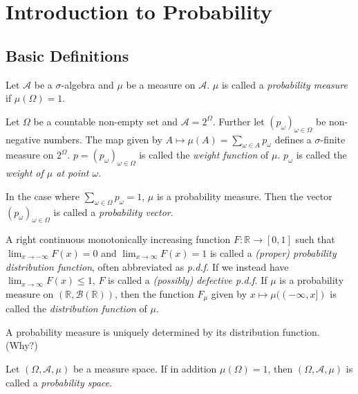 \section{Introduction to Probability}

\subsection{Basic Definitions}

\begin{definition}
    Let $\mathcal{A}$ be a $\sigma$-algebra and $\mu$ be a measure on $\mathcal{A}$. $\mu$ is called a \textit{probability measure} if $\mu(\Omega)=1$.
\end{definition}

Let $\Omega$ be a countable non-empty set and $\mathcal{A}=2^\Omega$. Further let $(p_\omega)_{\omega\in\Omega}$ be non-negative numbers. The map given by $A\mapsto\mu(A)=\sum_{\omega\in A}p_\omega$ defines a $\sigma$-finite measure on $2^\Omega$. $p=(p_\omega)_{\omega\in\Omega}$ is called the \textit{weight function} of $\mu$. $p_\omega$ is called the \textit{weight of $\mu$ at point $\omega$}.

In the case where $\sum_{\omega\in\Omega}p_\omega=1$, $\mu$ is a probability measure. Then the vector $(p_\omega)_{\omega\in\Omega}$ is called a \textit{probability vector}. 

\begin{definition}
    A right continuous monotonically increasing function $F:\mathbb{R}\to[0,1]$ such that $\lim_{x\to-\infty}F(x)=0$ and $\lim_{x\to\infty}F(x)=1$ is called a \textit{(proper) probability distribution function}, often abbreviated as \textit{p.d.f.} If we instead have $\lim_{x\to\infty}F(x)\leq 1$, $F$ is called a \textit{(possibly) defective p.d.f.} If $\mu$ is a probability measure on $(\mathbb{R},\mathcal{B}(\mathbb{R}))$, then the function $F_\mu$ given by $x\mapsto \mu((-\infty,x])$ is called the \textit{distribution function} of $\mu$.
\end{definition}

A probability measure is uniquely determined by its distribution function. (Why?)

\begin{definition}
    Let $(\Omega,\mathcal{A},\mu)$ be a measure space. If in addition $\mu(\Omega)=1$, then $(\Omega,\mathcal{A},\mu)$ is called a \textit{probability space}.
\end{definition}

